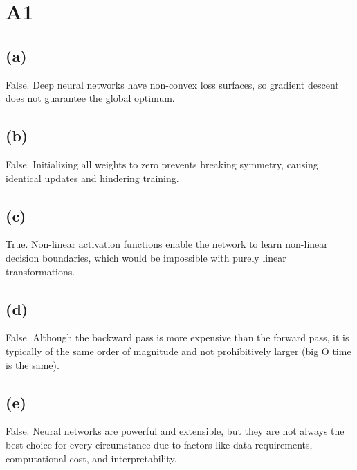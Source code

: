 \documentclass{article}
\begin{document}
\section*{A1}

\subsection*{(a)}
False. Deep neural networks have non-convex loss surfaces, so gradient descent does not guarantee the global optimum.

\subsection*{(b)}
False. Initializing all weights to zero prevents breaking symmetry, causing identical updates and hindering training.

\subsection*{(c)}
True. Non-linear activation functions enable the network to learn non-linear decision boundaries, which would be impossible with purely linear transformations.

\subsection*{(d)}
False. Although the backward pass is more expensive than the forward pass, it is typically of the same order of magnitude and not prohibitively larger (big O time is the same).

\subsection*{(e)}
False. Neural networks are powerful and extensible, but they are not always the best choice for every circumstance due to factors like data requirements, computational cost, and interpretability.
\end{document}
